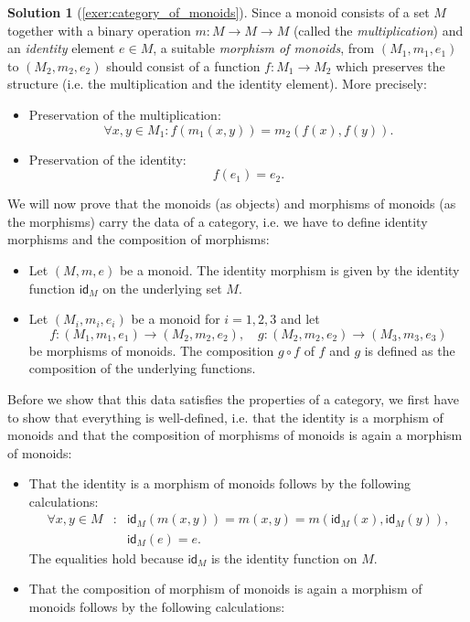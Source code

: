 \documentclass[a4paper,11pt, oneside,titlepage=false]{scrbook}
\theoremstyle{plain}
\theoremstyle{definition}
\newtheorem{solution}[thm]{Solution}
\newcommand{\cfont}[1]{\ensuremath{\mathsf{#1}}}
\newcommand{\Id}[1][]{\cfont{id}_{#1}}
\newcommand{\co}[2]{\ensuremath{#2 \circ #1}}
\begin{document}
\begin{solution}[\cref{exer:category_of_monoids}]\label{sol:category_of_monoids}
Since a monoid consists of a set $M$ together with a binary operation $m:M\to M\to M$ (called the \textit{multiplication}) and an \textit{identity} element $e\in M$, a suitable \textit{morphism of monoids}, from $(M_1,m_1,e_1)$ to $(M_2,m_2,e_2)$ should consist of a function $f:M_1\to M_2$ which preserves the structure (i.e. the multiplication and the identity element). More precisely:
\begin{itemize}
\item Preservation of the multiplication:
\[
\forall x,y\in M_1: f(m_1(x,y)) = m_2(f(x), f(y)).
\]
\item Preservation of the identity:
\[
f(e_1) = e_2.
\]
\end{itemize}
We will now prove that the monoids (as objects) and morphisms of monoids (as the morphisms) carry the data of a category, i.e. we have to define identity morphisms and the composition of morphisms:
\begin{itemize}
\item Let $(M,m,e)$ be a monoid. The identity morphism is given by the identity function $\Id[M]$ on the underlying set $M$.
\item Let $(M_i,m_i,e_i)$ be a monoid for $i=1,2,3$ and let
\[
f:(M_1,m_1,e_1)\to (M_2,m_2,e_2),\quad g:(M_2,m_2,e_2)\to (M_3,m_3,e_3)
\]
be morphisms of monoids. The composition $\co{f}{g}$ of $f$ and $g$ is defined as the composition of the underlying functions.
\end{itemize}
Before we show that this data satisfies the properties of a category, we first have to show that everything is well-defined, i.e. that the identity is a morphism of monoids and that the composition of morphisms of monoids is again a morphism of monoids:
\begin{itemize}
\item That the identity is a morphism of monoids follows by the following calculations:
\begin{eqnarray*}
\forall x,y\in M &:& \Id[M](m(x,y)) = m(x,y) = m(\Id[M](x),\Id[M](y)),\\
&& \Id[M](e) = e.
\end{eqnarray*}
The equalities hold because $\Id[M]$ is the identity function on $M$.
\item That the composition of morphism of monoids is again a morphism of monoids follows by the following calculations:
\begin{itemize}

\end{itemize}
\end{itemize}
\end{solution}
\end{document}
